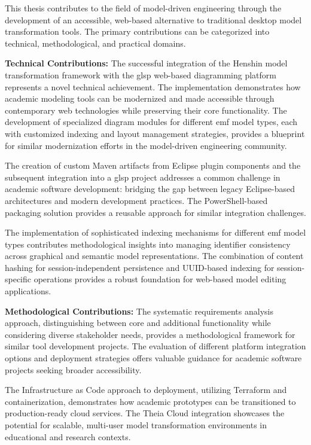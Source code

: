   This thesis contributes to the field of model-driven engineering through the development of an accessible, web-based alternative to traditional desktop model transformation tools. The primary contributions can be categorized into technical, methodological, and practical domains.

  \textbf{Technical Contributions:} The successful integration of the Henshin model transformation framework with the \ac{glsp} web-based diagramming platform represents a novel technical achievement. The implementation demonstrates how academic modeling tools can be modernized and made accessible through contemporary web technologies while preserving their core functionality. The development of specialized diagram modules for different \ac{emf} model types, each with customized indexing and layout management strategies, provides a blueprint for similar modernization efforts in the model-driven engineering community.

  The creation of custom Maven artifacts from Eclipse plugin components and the subsequent integration into a \ac{glsp} project addresses a common challenge in academic software development: bridging the gap between legacy Eclipse-based architectures and modern development practices. The PowerShell-based packaging solution provides a reusable approach for similar integration challenges.

  The implementation of sophisticated indexing mechanisms for different \ac{emf} model types contributes methodological insights into managing identifier consistency across graphical and semantic model representations. The combination of content hashing for session-independent persistence and UUID-based indexing for session-specific operations provides a robust foundation for web-based model editing applications.

  \textbf{Methodological Contributions:} The systematic requirements analysis approach, distinguishing between core and additional functionality while considering diverse stakeholder needs, provides a methodological framework for similar tool development projects. The evaluation of different platform integration options and deployment strategies offers valuable guidance for academic software projects seeking broader accessibility.

  The Infrastructure as Code approach to deployment, utilizing Terraform and containerization, demonstrates how academic prototypes can be transitioned to production-ready cloud services. The Theia Cloud integration showcases the potential for scalable, multi-user model transformation environments in educational and research contexts.


